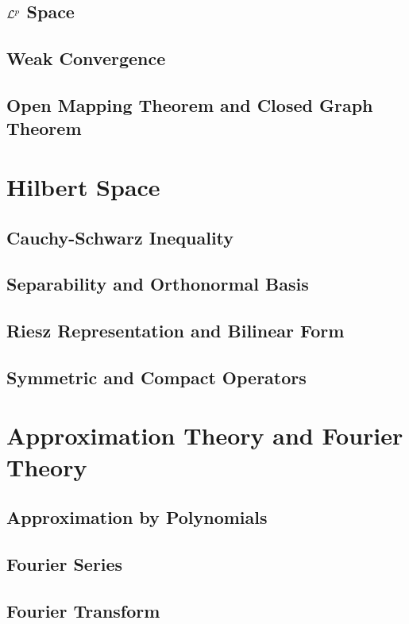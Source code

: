 \documentclass[a4paper, 12pt]{article}
\begin{document}
\subsection{$\mathcal{L}^p$ Space}


\subsection{Weak Convergence}


\subsection{Open Mapping Theorem and Closed Graph Theorem}


\newpage
\section{Hilbert Space}

\subsection{Cauchy-Schwarz Inequality}


\subsection{Separability and Orthonormal Basis}


\subsection{Riesz Representation and Bilinear Form}


\subsection{Symmetric and Compact Operators}


\section{Approximation Theory and Fourier Theory}

\subsection{Approximation by Polynomials}


\subsection{Fourier Series}


\subsection{Fourier Transform}

\end{document}
